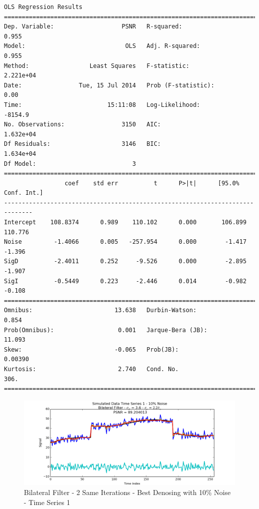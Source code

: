 \documentclass[11pt]{article}
\theoremstyle{definition}
\begin{document}
{\begin{lstlisting}[caption = Time Series 3 - Bilateral Filter 2 Same Iterations OLS Model, label = {2samebilateral3}]
                            OLS Regression Results                            
==============================================================================
Dep. Variable:                   PSNR   R-squared:                       0.955
Model:                            OLS   Adj. R-squared:                  0.955
Method:                 Least Squares   F-statistic:                 2.221e+04
Date:                Tue, 15 Jul 2014   Prob (F-statistic):               0.00
Time:                        15:11:08   Log-Likelihood:                -8154.9
No. Observations:                3150   AIC:                         1.632e+04
Df Residuals:                    3146   BIC:                         1.634e+04
Df Model:                           3                                         
==============================================================================
                 coef    std err          t      P>|t|      [95.0% Conf. Int.]
------------------------------------------------------------------------------
Intercept    108.8374      0.989    110.102      0.000       106.899   110.776
Noise         -1.4066      0.005   -257.954      0.000        -1.417    -1.396
SigD          -2.4011      0.252     -9.526      0.000        -2.895    -1.907
SigI          -0.5449      0.223     -2.446      0.014        -0.982    -0.108
==============================================================================
Omnibus:                       13.638   Durbin-Watson:                   0.854
Prob(Omnibus):                  0.001   Jarque-Bera (JB):               11.093
Skew:                          -0.065   Prob(JB):                      0.00390
Kurtosis:                       2.740   Cond. No.                         306.
==============================================================================
\end{lstlisting}
}

\begin{figure}
\centering
\includegraphics[width = 0.75 \textwidth]{2SameBilateralSignal1Best.png}
\caption{Bilateral Filter - 2 Same Iterations - Best Denosing with 10\% Noise - Time Series 1}
\label{2samebilateral1best}
\end{figure}
\end{document}
